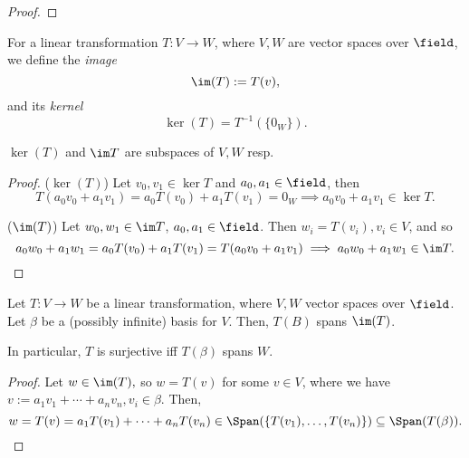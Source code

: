 \begin{proof}
\end{proof}

\begin{definition}
    For a linear transformation $T: V \to W$, where $V, W$ are vector spaces over $\field$, we define the \emph{image} \[
        \im (T)  := T(v),
    \]
    and its \emph{kernel} \[
    \ker (T) = T^{-1}(\{0_W\}).
    \]
\end{definition}

\begin{proposition}
    $\ker (T)$ and $\im T$ are subspaces of $V, W$ resp.
\end{proposition}

\begin{proof}
 \noindent($\ker (T)$) Let $v_0, v_1 \in \ker T$ and $a_0, a_1 \in \field$, then \[
 T(a_0 v_0  + a_1 v_1) = a_0T(v_0) + a_1T(v_1) = 0_W \implies a_0v_0 + a_1v_1 \in \ker T.   
 \]

\noindent ($\im (T)$) Let $w_0, w_1 \in \im T$, $a_0, a_1 \in \field$. Then $w_i = T(v_i), v_i \in V$, and so \[
a_0 w_0 + a_1 w_1 = a_0 T(v_0) + a_1T(v_1) = T(a_0 v_0 + a_1 v_1) \implies a_0 w_0 + a_1 w_1 \in \im T.    
\]
\end{proof}

\begin{proposition}
    Let $T: V \to W$ be a linear transformation, where $V, W$ vector spaces over $\field$. Let $\beta$ be a (possibly infinite) basis for $V$. Then, $T (B)$ spans $\im (T)$. 
    
    In particular, $T$ is surjective iff $T(\beta)$ spans $W$.
\end{proposition}

\begin{proof}
    Let $w \in \im(T),$ so $w = T(v)$ for some $v \in V$, where we have $v:= a_1 v_1 + \cdots + a_n v_n, v_i \in \beta$. Then, \[
    w = T(v) = a_1 T(v_1) + \cdots + a_n T(v_n) \in \Span(\{T(v_1), \dots, T(v_n)\}) \subseteq \Span(T(\beta)).
    \]

\end{proof}